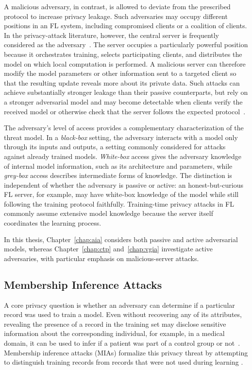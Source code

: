 A malicious adversary, in contrast, is allowed to deviate from the prescribed protocol to increase privacy leakage. Such adversaries may occupy different positions in an FL system, including compromised clients or a coalition of clients. In the privacy-attack literature, however, the central server is frequently considered as the adversary~\cite{Nasr2018ComprehensivePA, zhao_fl_attacks_review, carletti2025sok}. The server occupies a particularly powerful position because it orchestrates training, selects participating clients, and distributes the model on which local computation is performed. A malicious server can therefore modify the model parameters or other information sent to a targeted client so that the resulting update reveals more about its private data. Such attacks can achieve substantially stronger leakage than their passive counterparts, but rely on a stronger adversarial model and may become detectable when clients verify the received model or otherwise check that the server follows the expected protocol~\cite{mia_survey_bai, carletti2026detectability}.

The adversary's level of access provides a complementary characterization of the threat model. In a \textit{black-box} setting, the adversary interacts with a model only through its inputs and outputs, a setting commonly considered for attacks against already trained models. \textit{White-box} access gives the adversary knowledge of internal model information, such as its architecture and parameters, while \textit{grey-box} access describes intermediate forms of knowledge. The distinction is independent of whether the adversary is passive or active: an honest-but-curious FL server, for example, may have white-box knowledge of the model while still following the training protocol faithfully. Training-time privacy attacks in FL commonly assume extensive model knowledge because the server itself coordinates the learning process.

In this thesis, Chapter~\ref{chap:aia} considers both passive and active adversarial models, whereas Chapter~\ref{chap:ctp} and~\ref{chap:vgia} investigate active adversaries, with particular emphasis on malicious-server attacks.


\subsection{Membership Inference Attacks}

A core privacy question is whether an adversary can determine if a particular record was used to train a model. Even without recovering any of its attributes, revealing the presence of a record in the training set may disclose sensitive information about the corresponding individual, for example, in a medical domain, it can be used to infer if a patient was part of a control group or not~\cite{yeom2018privacyriskmachinelearning}. Membership inference attacks (MIAs) formalize this privacy threat by attempting to distinguish training records from records that were not used during learning \cite{shokri2017membershipinferenceattacksmachine,yeom2018privacyriskmachinelearning,mia_survey_bai}.

